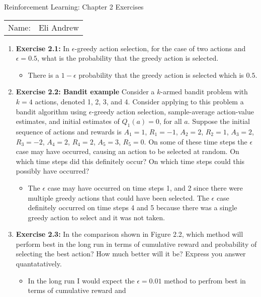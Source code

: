 \documentclass[12pt]{article}
\begin{document}
\begin{center}
{\Large Reinforcement Learning: Chapter 2 Exercises}

\begin{tabular}{rl}
Name: & Eli Andrew
\end{tabular}
\end{center}

\begin{enumerate}[label=(\alph*)]
  \item \textbf{Exercise 2.1:} In $\epsilon$-greedy action selection, for the case of two actions
  and $\epsilon = 0.5$, what is the probability that the greedy action is selected. 
  \begin{itemize}
    \item There is a $1 - \epsilon$ probability that the greedy action is selected which is $0.5$. 
  \end{itemize}
  \item \textbf{Exercise 2.2: Bandit example} Consider a $k$-armed bandit problem with $k=4$ actions,
  denoted 1, 2, 3, and 4. Consider applying to this problem a bandit algorithm using $\epsilon$-greedy
  action selection, sample-average action-value estimates, and initial estimates of $Q_1(a) = 0$, for all
  $a$. Suppose the initial sequence of actions and rewards is $A_1 = 1$, $R_1 = -1$, $A_2 = 2$, $R_2 = 1$,
  $A_3 = 2$, $R_3 = -2$, $A_4 = 2$, $R_4 = 2$, $A_5 = 3$, $R_5 = 0$. On some of these time steps the $\epsilon$
  case may have occurred, causing an action to be selected at random. On which time steps did this definitely occur?
  On which time steps could this possibly have occurred?
  \begin{itemize}
    \item The $\epsilon$ case may have occurred on time steps 1, and 2 since there were multiple greedy actions
    that could have been selected. The $\epsilon$ case definitely occurred on time steps 4 and 5 because there was a single
    greedy action to select and it was not taken.
  \end{itemize}
  \item \textbf{Exercise 2.3:} In the comparison shown in Figure 2.2, which method will perform best in the long run in
  terms of cumulative reward and probability of selecting the best action? How much better will it be? Express you answer
  quantatatively.
  \begin{itemize}
    \item In the long run I would expect the $\epsilon = 0.01$ method to perfrom best in terms of cumulative reward and

\end{itemize}
\end{enumerate}
\end{document}

